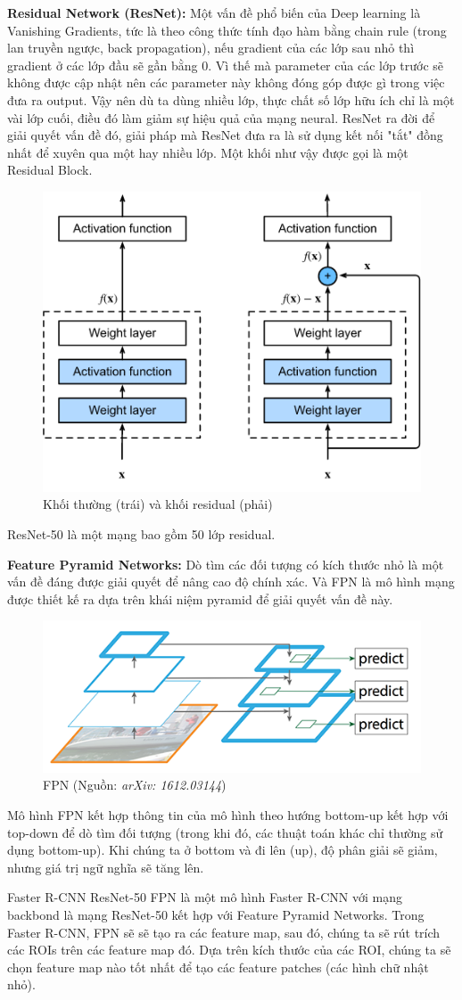 \documentclass[a4paper, 12pt]{report}
\begin{document}
\textbf{Residual Network (ResNet):} Một vấn đề phổ biến của Deep learning là Vanishing Gradients, tức là theo công thức tính đạo hàm bằng chain rule (trong lan truyền ngược, back propagation), nếu gradient của các lớp sau nhỏ thì gradient ở các lớp đầu sẽ gần bằng 0. Vì thế mà parameter của các lớp trước sẽ không được cập nhật nên các parameter này không đóng góp được gì trong việc đưa ra output. Vậy nên dù ta dùng nhiều lớp, thực chất số lớp hữu ích chỉ là một vài lớp cuối, điều đó làm giảm sự hiệu quả của mạng neural. ResNet ra đời để giải quyết vấn đề đó, giải pháp mà ResNet đưa ra là sử dụng kết nối "tắt" đồng nhất để xuyên qua một hay nhiều lớp. Một khối như vậy được gọi là một Residual Block.\par
\begin{figure}[!h]
	\centering
	\includegraphics[width=0.5\linewidth]{Images/resnet_1}
	\caption{Khối thường (trái) và khối residual (phải)}
	\label{fig:resnet-1}
\end{figure}
ResNet-50 là một mạng bao gồm 50 lớp residual.\par
\textbf{Feature Pyramid Networks:} Dò tìm các đối tượng có kích thước nhỏ là một vấn đề đáng được giải quyết để nâng cao độ chính xác. Và FPN là mô hình mạng được thiết kế ra dựa trên khái niệm pyramid để giải quyết vấn đề này.\par
\begin{figure}[!h]
	\centering
	\includegraphics[width=0.7\linewidth]{Images/fpn}
	\caption{FPN (Nguồn:\textit{ arXiv: 1612.03144})}
	\label{fig:fpn}
\end{figure}
Mô hình FPN kết hợp thông tin của mô hình theo hướng bottom-up kết hợp với top-down để dò tìm đối tượng (trong khi đó, các thuật toán khác chỉ thường sử dụng bottom-up). Khi chúng ta ở bottom và đi lên (up), độ phân giải sẽ giảm, nhưng giá trị ngữ nghĩa sẽ tăng lên.\par
Faster R-CNN ResNet-50 FPN là một mô hình Faster R-CNN với mạng backbond là mạng ResNet-50 kết hợp với Feature Pyramid Networks. Trong Faster R-CNN, FPN sẽ sẽ tạo ra các feature map, sau đó, chúng ta sẽ rút trích các ROIs trên các feature map đó. Dựa trên kích thước của các ROI, chúng ta sẽ chọn feature map nào tốt nhất để tạo các feature patches (các hình chữ nhật nhỏ).\par
\end{document}
